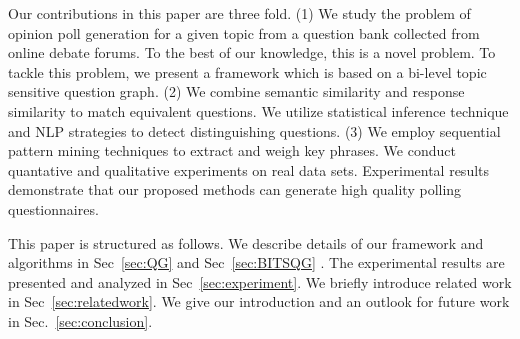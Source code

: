 \documentclass{llncs}
\begin{document}



Our contributions in this paper are three fold. (1) We study the problem of opinion poll generation for a given topic from a question bank collected from online debate forums. To the best of our knowledge, this is a novel problem. To tackle this problem, we present a framework which is based on a bi-level topic sensitive question graph. (2) We combine semantic similarity and response similarity to match equivalent questions. We utilize statistical inference technique and NLP strategies to detect distinguishing questions. (3) We employ sequential pattern mining techniques to extract and weigh key phrases. We conduct quantative and qualitative experiments on real data sets. Experimental results demonstrate that our proposed methods can generate high quality polling questionnaires.


This paper is structured as follows. We describe details of our framework and algorithms in Sec~\ref{sec:QG} and Sec~\ref{sec:BITSQG} . The experimental results are presented and analyzed in Sec~\ref{sec:experiment}. We briefly introduce related work in Sec~\ref{sec:relatedwork}. We give our introduction and an outlook for future work in Sec.~\ref{sec:conclusion}.
\end{document}

